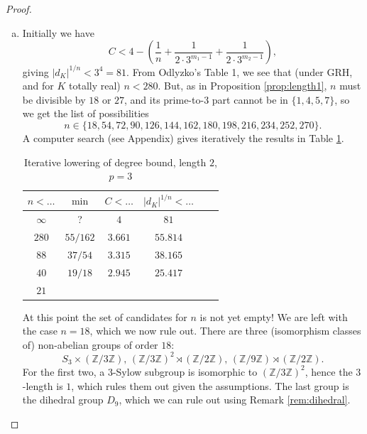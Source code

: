 \documentclass{amsart}
\theoremstyle{definition}
\newcommand{\Z}{\mathbb{Z}}
\begin{document}
\begin{proof}
\begin{enumerate}[(a)]
      At this point we have $n<56$ and the set of suitable $n$ is empty.

    \item
      Initially we have
      \begin{equation*}
        C < 4 - \left(\frac{1}{n}+\frac{1}{2\cdot 3^{m_1-1}}+\frac{1}{2\cdot 3^{m_2-1}}\right),
      \end{equation*}
      giving $|d_K|^{1/n}<3^4=81$.
      From Odlyzko's Table 1, we see that (under GRH, and for $K$ totally real) $n<280$.
      But, as in Proposition \ref{prop:length1}, $n$ must be divisible by $18$ or $27$, and its prime-to-$3$ part cannot be in $\{1,4,5,7\}$, so we get the list of possibilities
      \begin{equation*}
        n\in\{18, 54, 72, 90, 126, 144, 162, 180, 198, 216, 234, 252, 270\}.
      \end{equation*}
      A computer search (see Appendix) gives iteratively the results in Table \ref{tab_length2_p3}.

      \begin{table}[h]
        \begin{tabular}{cccccl}
          \toprule
          $n<\dots$ & $\min$   & $C<\dots$ & $|d_K|^{1/n}<\dots$ \\ \midrule
          $\infty$  & ?        & $4$       & $81$                \\
          $280$     & $55/162$ & $3.661$   & $55.814$            \\
          $88$      & $37/54$  & $3.315$   & $38.165$            \\
          $40$      & $19/18$  & $2.945$   & $25.417$            \\
          $21$                                                   \\
          \bottomrule
        \end{tabular}
        \caption{Iterative lowering of degree bound, length $2$, $p=3$}
        \label{tab_length2_p3}
      \end{table}

      At this point the set of candidates for $n$ is not yet empty!
      We are left with the case $n=18$, which we now rule out.
      There are three (isomorphism classes of) non-abelian groups of order $18$:
      \begin{equation*}
        S_3\times (\Z/3\Z),\, (\Z/3\Z)^2\rtimes (\Z/2\Z),\, (\Z/9\Z)\rtimes (\Z/2\Z).
      \end{equation*}
      For the first two, a $3$-Sylow subgroup is isomorphic to $(\Z/3\Z)^2$, hence the $3$-length is $1$, which rules them out given the assumptions.
      The last group is the dihedral group $D_9$, which we can rule out using Remark \ref{rem:dihedral}.
      \qedhere
  \end{enumerate}
\end{proof}
\end{document}
